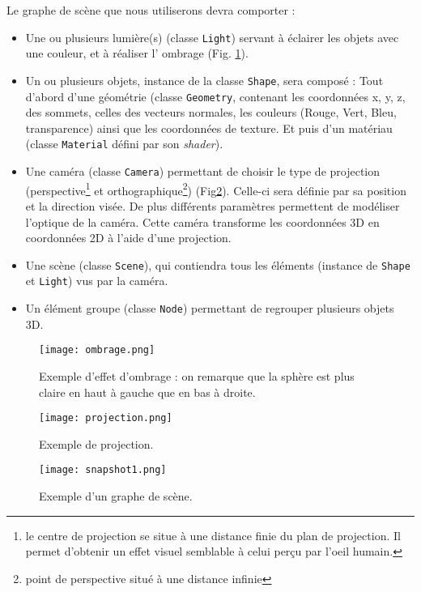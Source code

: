 \documentclass[11pt]{report}
\begin{document}
Le graphe de scène que nous utiliserons devra comporter : 
\begin{itemize}
\item Une ou plusieurs lumière(s) (classe \texttt{Light}) servant à éclairer les objets avec une couleur, et à réaliser l' ombrage (Fig. \ref{ombrage}).
\item Un ou plusieurs objets, instance de la classe \texttt{Shape}, sera composé : Tout d'abord d'une géométrie (classe \texttt{Geometry}, contenant les coordonnées x, y, z, des sommets, celles des vecteurs normales, les couleurs (Rouge, Vert, Bleu, transparence) ainsi que les coordonnées de texture. Et puis d'un matériau (classe \texttt{Material} défini par son \textit{shader}). %
\item Une caméra (classe \texttt{Camera}) permettant de choisir le type de projection (perspective\footnote{le centre de projection se situe à une distance finie du plan de projection. Il permet d’obtenir un effet visuel semblable à celui perçu par l’oeil humain.} et orthographique\footnote{point de perspective situé à une distance infinie}) (Fig\ref{projection}). Celle-ci sera définie par sa position et la direction visée. De plus différents paramètres permettent de modéliser l'optique de la caméra. Cette caméra transforme les coordonnées 3D en coordonnées 2D à l'aide d'une projection.
\item Une scène (classe \texttt{Scene}), qui contiendra tous les éléments (instance de \texttt{Shape} et \texttt{Light}) vus par la caméra.
\item Un élément groupe (classe \texttt{Node}) permettant de regrouper plusieurs objets 3D.
\end{itemize}


\begin{figure}[h!]
  \caption{Exemple d'effet d'ombrage : on remarque que la sphère est plus claire en haut à gauche que en bas à droite.}
  \centering
\texttt{[image: ombrage.png]} 
\label{ombrage}
\end{figure}

\begin{figure}[h!]
  \caption{Exemple de projection.}
  \label{projection}
  \centering
    \texttt{[image: projection.png]}
\end{figure}

\begin{figure}[h!]
  \caption{Exemple d'un graphe de scène.}
  \centering
\texttt{[image: snapshot1.png]} 
\label{graphscene}
\end{figure}
\end{document}
